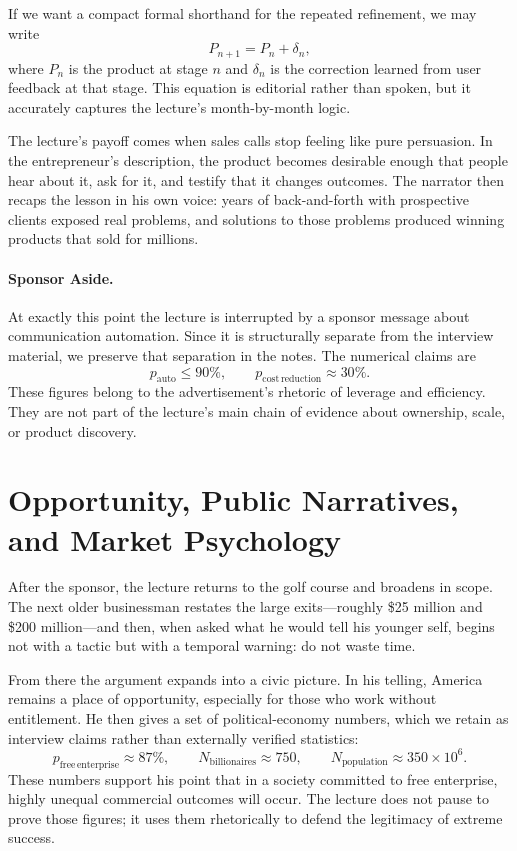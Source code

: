 If we want a compact formal shorthand for the repeated refinement, we may write
\begin{equation}
P_{n+1} = P_n + \delta_n,
\end{equation}
where $P_n$ is the product at stage $n$ and $\delta_n$ is the correction learned from user feedback at that stage. This equation is editorial rather than spoken, but it accurately captures the lecture's month-by-month logic.

The lecture's payoff comes when sales calls stop feeling like pure persuasion. In the entrepreneur's description, the product becomes desirable enough that people hear about it, ask for it, and testify that it changes outcomes. The narrator then recaps the lesson in his own voice: years of back-and-forth with prospective clients exposed real problems, and solutions to those problems produced winning products that sold for millions.

\paragraph{Sponsor Aside.} At exactly this point the lecture is interrupted by a sponsor message about communication automation. Since it is structurally separate from the interview material, we preserve that separation in the notes. The numerical claims are
\begin{equation}
p_{\mathrm{auto}} \le 90\%, \qquad
p_{\mathrm{cost\,reduction}} \approx 30\%.
\end{equation}
These figures belong to the advertisement's rhetoric of leverage and efficiency. They are not part of the lecture's main chain of evidence about ownership, scale, or product discovery.

\section{Opportunity, Public Narratives, and Market Psychology}

After the sponsor, the lecture returns to the golf course and broadens in scope. The next older businessman restates the large exits---roughly \$25 million and \$200 million---and then, when asked what he would tell his younger self, begins not with a tactic but with a temporal warning: do not waste time.

From there the argument expands into a civic picture. In his telling, America remains a place of opportunity, especially for those who work without entitlement. He then gives a set of political-economy numbers, which we retain as interview claims rather than externally verified statistics:
\begin{equation}
p_{\mathrm{free\,enterprise}} \approx 87\%, \qquad
N_{\mathrm{billionaires}} \approx 750, \qquad
N_{\mathrm{population}} \approx 350\times 10^6.
\end{equation}
These numbers support his point that in a society committed to free enterprise, highly unequal commercial outcomes will occur. The lecture does not pause to prove those figures; it uses them rhetorically to defend the legitimacy of extreme success.

